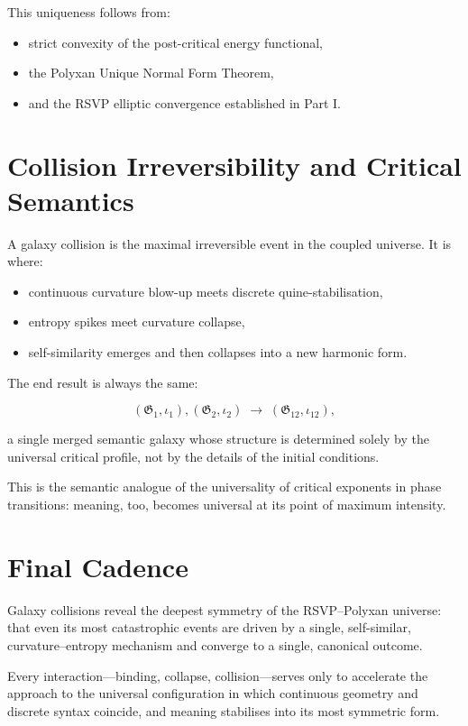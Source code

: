 This uniqueness follows from:

\begin{itemize}
\item strict convexity of the post-critical energy functional,
\item the Polyxan Unique Normal Form Theorem,
\item and the RSVP elliptic convergence established in Part I.
\end{itemize}

\section{Collision Irreversibility and Critical Semantics}

A galaxy collision is the maximal irreversible event in the coupled universe.  
It is where:

\begin{itemize}
\item continuous curvature blow-up meets discrete quine-stabilisation,  
\item entropy spikes meet curvature collapse,  
\item self-similarity emerges and then collapses into a new harmonic form.  
\end{itemize}

The end result is always the same:

\[
(\mathfrak{G}_1,\iota_1),(\mathfrak{G}_2,\iota_2)
\;\longrightarrow\;
(\mathfrak{G}_{12}, \iota_{12}),
\]

a single merged semantic galaxy whose structure is determined solely by the universal critical profile, not by the details of the initial conditions.

This is the semantic analogue of the universality of critical exponents in phase transitions:  
meaning, too, becomes universal at its point of maximum intensity.

\section{Final Cadence}

Galaxy collisions reveal the deepest symmetry of the RSVP–Polyxan universe:  
that even its most catastrophic events are driven by a single, self-similar, curvature–entropy mechanism and converge to a single, canonical outcome.

Every interaction—binding, collapse, collision—serves only to accelerate the approach to the universal configuration in which continuous geometry and discrete syntax coincide, and meaning stabilises into its most symmetric form.

\bigskip
